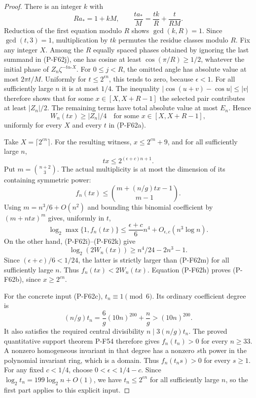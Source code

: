 \begin{proof}
There is an integer $k$ with
\[
             Ra_*=1+kM,
       \qquad\frac{ta_*}{M}=\frac{tk}{R}+\frac{t}{RM}.
                                                               \tag{P-F62j}
\]
Reduction of the first equation modulo $R$ shows
$\gcd(k,R)=1$. Since $\gcd(t,3)=1$, multiplication
by $tk$ permutes the residue classes modulo $R$.
Fix any integer $X$. Among the $R$ equally spaced phases
obtained by ignoring the last summand in (P-F62j), one
has cosine at least $\cos(\pi/R)\ge1/2$, whatever the
initial phase of $Z_n\zeta^{-ta_*X}$.
For $0\le j<R$, the omitted angle has absolute value
at most $2\pi t/M$. Uniformly for $t\le2^{\epsilon n}$,
this tends to zero, because $\epsilon<1$.
For all sufficiently large $n$ it is at most $1/4$.
The inequality $|\cos(u+v)-\cos u|\le|v|$ therefore
shows that for some $x\in[X,X+R-1]$ the selected pair
contributes at least $|Z_n|/2$. The remaining terms
have total absolute value at most $E_n$. Hence
\[
       W_n(tx)\ge |Z_n|/4
       \quad\text{for some }x\in[X,X+R-1],
                                                               \tag{P-F62k}
\]
uniformly for every $X$ and every $t$ in (P-F62a).

Take $X=\lceil2^{cn}\rceil$. For the resulting witness,
$x\le2^{cn}+9$, and for all sufficiently large $n$,
\[
                  tx\le2^{(\epsilon+c)n+1}.
\]
Put $m=\binom{n+2}{3}$. The actual multiplicity is at most
the dimension of its containing symmetric power:
\[
 f_n(tx)
       \le\binom{m+(n/g)tx-1}{m-1}.
                                                               \tag{P-F62l}
\]
Using $m=n^3/6+O(n^2)$ and bounding this binomial
coefficient by $(m+ntx)^m$ gives, uniformly in $t$,
\[
 \log_2\max\{1,f_n(tx)\}
       \le\frac{\epsilon+c}{6}n^4+O_{\epsilon,c}(n^3\log n).
                                                               \tag{P-F62m}
\]
On the other hand, (P-F62i)--(P-F62k) give
\[
       \log_2(2W_n(tx))\ge n^4/24-2n^3-1.
\]
Since $(\epsilon+c)/6<1/24$, the latter is strictly
larger than (P-F62m) for all sufficiently large $n$.
Thus $f_n(tx)<2W_n(tx)$. Equation (P-F62h) proves
(P-F62b), since $x\ge2^{cn}$.

For the concrete input (P-F62c), $t_n\equiv1\pmod6$.
Its ordinary coefficient degree is
\[
        (n/g)t_n
          =\frac6g(10n)^{200}+\frac ng
                     >(10n)^{200}.
                                                               \tag{P-F62n}
\]
It also satisfies the required central divisibility
$n\mid3(n/g)t_n$. The proved quantitative support theorem
P-F54 therefore gives $f_n(t_n)>0$ for every $n\ge33$.
A nonzero homogeneous invariant in that degree has a
nonzero $s$th power in the polynomial invariant ring,
which is a domain. Thus $f_n(t_ns)>0$ for every $s\ge1$.
For any fixed $c<1/4$, choose
$0<\epsilon<1/4-c$. Since $\log_2t_n=199\log_2n+O(1)$,
we have $t_n\le2^{\epsilon n}$ for all sufficiently large
$n$, so the first part applies to this explicit input.


\end{proof}
